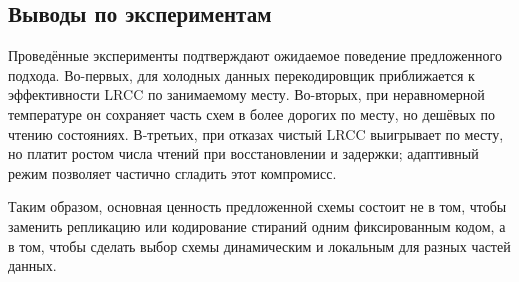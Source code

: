 \subsection{Выводы по экспериментам}

Проведённые эксперименты подтверждают ожидаемое поведение предложенного
подхода. Во-первых, для холодных данных перекодировщик приближается к
эффективности LRCC по занимаемому месту. Во-вторых, при неравномерной
температуре он сохраняет часть схем в более дорогих по месту, но дешёвых по
чтению состояниях. В-третьих, при отказах чистый LRCC выигрывает по месту, но
платит ростом числа чтений при восстановлении и задержки; адаптивный режим
позволяет частично сгладить этот компромисс.

Таким образом, основная ценность предложенной схемы состоит не в том, чтобы
заменить репликацию или кодирование стираний одним фиксированным кодом, а в
том, чтобы сделать выбор схемы динамическим и локальным для разных частей
данных.

\FloatBarrier
\pagebreak
